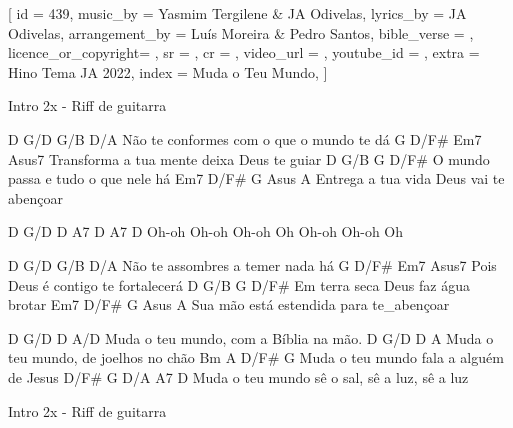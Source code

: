 [
    id                  = {439},
    music_by            = {Yasmim Tergilene & JA Odivelas}, %
    lyrics_by           = {JA Odivelas}, %
    arrangement_by      = {Luís Moreira & Pedro Santos}, %
    bible_verse         = {},
    licence_or_copyright= {},
    sr                  = {},
    cr                  = {},
    video_url           = {}, %
    youtube_id          = {}, %
    extra               = {Hino Tema JA 2022},
    index               = {Muda o Teu Mundo},
]

\beginverse
Intro 2x - Riff de guitarra
\endverse

\beginverse
D         G/D                G/B      D/A	
Não te conformes com o que o mundo te dá
     G           D/F#        Em7        Asus7
Transforma a tua mente deixa Deus te guiar
D       G/B            G        D/F#
O mundo passa e tudo o que nele há
  Em7         D/F#          G        Asus A
Entrega a tua vida Deus vai te abençoar

D     G/D   D     A7   D     A7    D
Oh-oh Oh-oh Oh-oh Oh   Oh-oh Oh-oh Oh

\endverse

\beginverse
D       G/D          G/B      D/A
Não te assombres a temer nada há
     G         D/F#       Em7   Asus7
Pois Deus é contigo te fortalecerá
D        G/B           G       D/F#
Em terra seca Deus faz água brotar
    Em7           D/F#         G     Asus A
Sua mão está estendida para te_abençoar

\endverse

\beginchorus
D          G/D          D         A/D
Muda o teu mundo, com a Bíblia na mão.
D          G/D         D        A
Muda o teu mundo, de joelhos no chão
Bm         A             D/F#       G
Muda o teu mundo fala a alguém de Jesus
D/F#       G          D/A       A7        D
Muda o teu mundo sê o sal, sê a luz, sê a luz

\endchorus

\beginverse
Intro 2x - Riff de guitarra
\endverse

